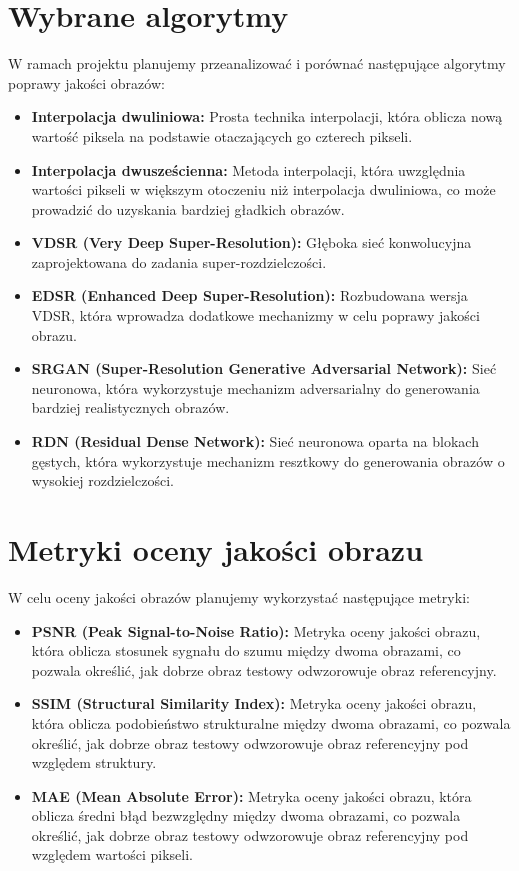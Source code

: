 \documentclass[10pt]{article}
\begin{document}
\section*{Wybrane algorytmy}
W ramach projektu planujemy przeanalizować i porównać następujące algorytmy poprawy jakości obrazów:
\begin{itemize}
    \item \textbf{Interpolacja dwuliniowa:} Prosta technika interpolacji, która oblicza nową wartość piksela na podstawie otaczających go czterech pikseli.
    \item \textbf{Interpolacja dwusześcienna:} Metoda interpolacji, która uwzględnia wartości pikseli w większym otoczeniu niż interpolacja dwuliniowa, co może prowadzić do uzyskania bardziej gładkich obrazów.
    \item \textbf{VDSR (Very Deep Super-Resolution):} Głęboka sieć konwolucyjna zaprojektowana do zadania super-rozdzielczości.
    \item \textbf{EDSR (Enhanced Deep Super-Resolution):} Rozbudowana wersja VDSR, która wprowadza dodatkowe mechanizmy w celu poprawy jakości obrazu.
    \item \textbf{SRGAN (Super-Resolution Generative Adversarial Network):} Sieć neuronowa, która wykorzystuje mechanizm adversarialny do generowania bardziej realistycznych obrazów.
    \item \textbf{RDN (Residual Dense Network):} Sieć neuronowa oparta na blokach gęstych, która wykorzystuje mechanizm resztkowy do generowania obrazów o wysokiej rozdzielczości.
\end{itemize}

\newpage
\section*{Metryki oceny jakości obrazu}
W celu oceny jakości obrazów planujemy wykorzystać następujące metryki:
\begin{itemize} 
    \item \textbf{PSNR (Peak Signal-to-Noise Ratio):} Metryka oceny jakości obrazu, która oblicza stosunek sygnału do szumu między dwoma obrazami, co pozwala określić, jak dobrze obraz testowy odwzorowuje obraz referencyjny.
    \item \textbf{SSIM (Structural Similarity Index):} Metryka oceny jakości obrazu, która oblicza podobieństwo strukturalne między dwoma obrazami, co pozwala określić, jak dobrze obraz testowy odwzorowuje obraz referencyjny pod względem struktury.
    \item \textbf{MAE (Mean Absolute Error):} Metryka oceny jakości obrazu, która oblicza średni błąd bezwzględny między dwoma obrazami, co pozwala określić, jak dobrze obraz testowy odwzorowuje obraz referencyjny pod względem wartości pikseli.
\end{itemize}
\end{document}

